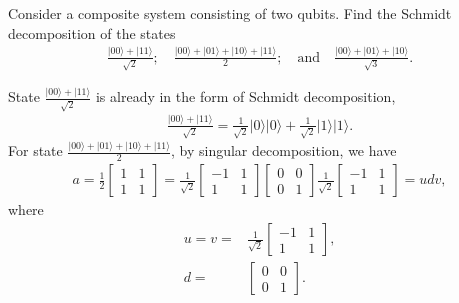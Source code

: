 \documentclass[en]{sol-man}
\begin{document}
\begin{exe}
    Consider a composite system consisting of two qubits. Find the Schmidt decomposition of the states
    \begin{align}
        \frac{\lvert 00\rangle+\lvert 11\rangle}{\sqrt{2}};\quad\frac{\lvert 00\rangle+\lvert 01\rangle+\lvert 10\rangle+\lvert 11\rangle}{2};\quad\text{and}\quad\frac{\lvert 00\rangle+\lvert 01\rangle+\lvert 10\rangle}{\sqrt{3}}.
    \end{align}
\end{exe}
\begin{pf}
    State $\frac{\lvert 00\rangle+\lvert 11\rangle}{\sqrt{2}}$ is already in the form of Schmidt decomposition,
    \begin{align}
        \frac{\lvert 00\rangle+\lvert 11\rangle}{\sqrt{2}}=\frac{1}{\sqrt{2}}\lvert 0\rangle\lvert 0\rangle+\frac{1}{\sqrt{2}}\lvert 1\rangle\lvert 1\rangle.
    \end{align}
    For state $\frac{\lvert 00\rangle+\lvert 01\rangle+\lvert 10\rangle+\lvert 11\rangle}{2}$, by singular decomposition, we have
    \begin{align}
        a=\frac{1}{2}\left[\begin{matrix}
            1&1\\
            1&1
        \end{matrix}\right]=\frac{1}{\sqrt{2}}\left[\begin{matrix}
            -1&1\\
            1&1
        \end{matrix}\right]\left[\begin{matrix}
            0&0\\
            0&1
        \end{matrix}\right]\frac{1}{\sqrt{2}}\left[\begin{matrix}
            -1&1\\
            1&1
        \end{matrix}\right]=udv,
    \end{align}
    where
    \begin{align}
        u=v=&\frac{1}{\sqrt{2}}\left[\begin{matrix}
            -1&1\\
            1&1
        \end{matrix}\right],\\
        d=&\left[\begin{matrix}
            0&0\\
            0&1
        \end{matrix}\right].

\end{align}
\end{pf}
\end{document}

